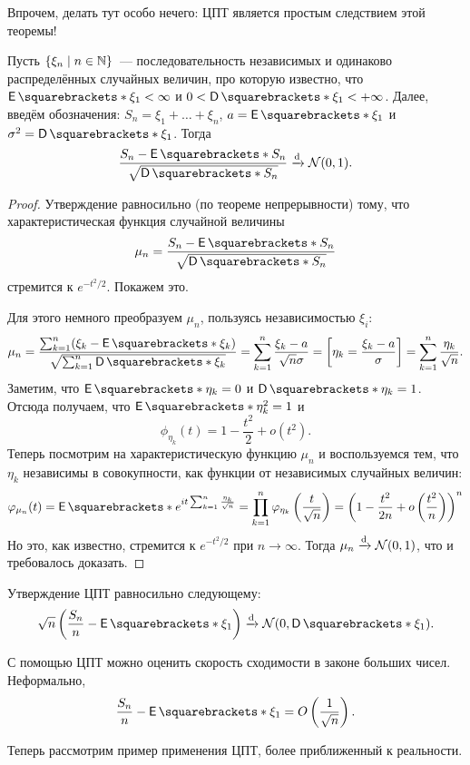Впрочем, делать тут особо нечего: ЦПТ является простым следствием этой теоремы!
\begin{theorem}
	Пусть \(\{\xi_{n} \mid n \in \mathbb{N}\}\)~--- последовательность независимых и 
	одинаково распределённых случайных величин, про которую известно, что 
	\(\E{\xi_1} < \infty\) и \(0 < \D{\xi_{1}} < +\infty\). Далее, введём 
	обозначения: \(S_n = \xi_{1} + \dots + \xi_{n}\), \(a = \E{\xi_1}\) и 
	\(\sigma^2 = \D{\xi_{1}}\). Тогда
	\[
		\frac{S_n - \E{S_n}}{\sqrt{\D{S_n}}} \dto \mathcal{N}(0, 1).
	\]
\end{theorem}
\begin{proof}
	Утверждение равносильно (по теореме непрерывности) тому, что 
	характеристическая функция случайной величины
	\[
		\mu_{n} = \frac{S_n - \E{S_n}}{\sqrt{\D{S_n}}}
	\]
	стремится к \(e^{-t^2/2}\). Покажем это.
	
	Для этого немного преобразуем \(\mu_{n}\), пользуясь независимостью 
	\(\xi_{i}\):
	\[
		\mu_{n} = \frac{\sum_{k = 1}^{n} (\xi_{k} - \E{\xi_{k}})}{\sqrt{\sum_{k 
		= 1}^{n} \D{\xi_{k}}}} = \sum_{k = 1}^{n} \frac{\xi_{k} - 
		a}{\sqrt{n}\sigma} = \left[\eta_{k} = \frac{\xi_{k} - a}{\sigma}\right] 
		= \sum_{k = 1}^{n} \frac{\eta_{k}}{\sqrt{n}}.
	\]
	Заметим, что \(\E{\eta_{k}} = 0\) и \(\D{\eta_{k}} = 1\). Отсюда получаем, 
	что \(\E{\eta_{k}^2} = 1\) и
	\[
		\phi_{\eta_k}(t) = 1 - \frac{t^2}{2} + o(t^2).
	\]
	Теперь посмотрим на характеристическую функцию \(\mu_{n}\) и воспользуемся 
	тем, что \(\eta_{k}\) независимы в совокупности, как функции от независимых 
	случайных величин:
	\[
		\phi_{\mu_n}(t) = \E{e^{it\sum_{k = 1}^{n} \frac{\eta_{k}}{\sqrt{n}}}} 
		= \prod_{k = 1}^{n} \phi_{\eta_k}\left(\frac{t}{\sqrt{n}}\right) = 
		\left(1 - \frac{t^2}{2n} + o\left(\frac{t^2}{n}\right)\right)^n
	\]
	Но это, как известно, стремится к \(e^{-t^2/2}\) при \(n \to \infty\). 
	Тогда \(\mu_{n} \xrightarrow{\mathrm{d}} \mathcal{N}(0, 1)\), что и требовалось доказать.
\end{proof}
\begin{remark}
	Утверждение ЦПТ равносильно следующему:
	\[
		\sqrt{n}\left(\frac{S_n}{n} - \E{\xi_{1}}\right) \dto \mathcal{N}(0, 
		\D{\xi_1}).
	\]
\end{remark}
\begin{consequence}
	С помощью ЦПТ можно оценить скорость сходимости в законе больших чисел. 
	Неформально,
	\[
		\frac{S_n}{n} - \E{\xi_{1}} = O\left(\frac{1}{\sqrt{n}}\right).
	\]
\end{consequence}
Теперь рассмотрим пример применения ЦПТ, более приближенный к реальности.
